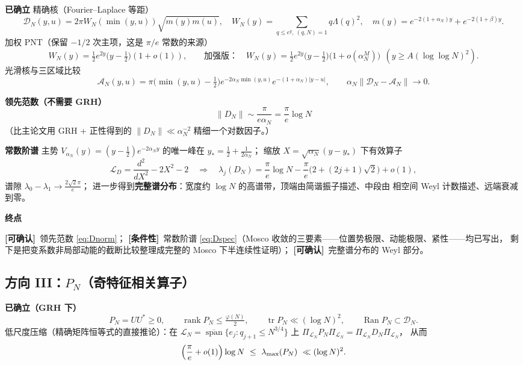 \documentclass[11pt,a4paper]{ctexart}
\newcommand{\Dk}{\mathcal{D}}
\newcommand{\Ak}{\mathcal{A}}
\newcommand{\al}{\alpha_{N}}
\newcommand{\be}{\beta}
\newcommand{\OK}{\textcolor{green!45!black}{\textbf{[可确认]}}}
\newcommand{\COND}{\textcolor{orange!85!black}{\textbf{[条件性]}}}
\begin{document}
\textbf{已确立}
精确核（Fourier--Laplace 等距）
\begin{equation}\label{eq:Dkernel}
\Dk_N(y,u)=2\pi W_N(\min(y,u))\sqrt{m(y)m(u)},\quad
W_N(y)=\sum_{q\le e^y,\ (q,N)=1}q\Lambda(q)^2,\quad
m(y)=e^{-2(1+\al)y}+e^{-2(1+\be)y}.
\end{equation}
加权 PNT（保留 $-1/2$ 次主项，这是 $\pi/e$ 常数的来源）
\begin{equation}\label{eq:PNT}
W_N(y)=\tfrac12e^{2y}\bigl(y-\tfrac12\bigr)(1+o(1)),
\qquad\text{加强版：}\quad
W_N(y)=\tfrac12e^{2y}\bigl(y-\tfrac12\bigr)\bigl(1+o(\al^M)\bigr)\ \ (y\ge A(\log\log N)^2).
\end{equation}
光滑核与三区域比较
\begin{equation}\label{eq:Asmooth}
\Ak_N(y,u)=\pi\bigl(\min(y,u)-\tfrac12\bigr)e^{-2\al\min(y,u)}e^{-(1+\al)|y-u|},
\qquad \al\|\Dk_N-\Ak_N\|\longrightarrow0 .
\end{equation}

\textbf{领先范数（不需要 GRH）}
\begin{equation}\label{eq:Dnorm}
\boxed{\ \|D_N\|\sim\frac{\pi}{e\al}=\frac{\pi}{e}\log N\ }
\end{equation}
（比主论文用 GRH + 正性得到的 $\|D_N\|\ll\al^{-2}$ 精细一个对数因子。）

\textbf{常数阶谱}
主势 $V_{\al}(y)=(y-\frac12)e^{-2\al y}$ 的唯一峰在 $y_*=\frac12+\frac{1}{2\al}$；
缩放 $X=\sqrt{\al}(y-y_*)$ 下有效算子
\begin{equation}
\mathcal L_D=\frac{d^2}{dX^2}-2X^2-2
\quad\Longrightarrow\quad
\lambda_j(D_N)=\frac{\pi}{e}\log N-\frac{\pi}{e}\bigl(2+(2j+1)\sqrt2\bigr)+o(1),\label{eq:Dspec}
\end{equation}
谱隙 $\lambda_0-\lambda_1\to\frac{2\sqrt2\pi}{e}$；
进一步得到\textbf{完整谱分布}：宽度约 $\log N$ 的高谱带，顶端由简谐振子描述、中段由
相空间 Weyl 计数描述、远端衰减到零。

\textbf{终点}

\OK\ 领先范数 \eqref{eq:Dnorm}；
\COND\ 常数阶谱 \eqref{eq:Dspec}（Mosco 收敛的三要素——位置势极限、动能极限、紧性——均已写出，
剩下是把变系数非局部动能的截断比较整理成完整的 Mosco 下半连续性证明）；
\OK\ 完整谱分布的 Weyl 部分。

\subsection{方向 III：$P_N$（奇特征相关算子）}

\textbf{已确立（GRH 下）}
\begin{equation}\label{eq:Pnd}
P_N=UU^*\ge0,\qquad \operatorname{rank}P_N\le\tfrac{\varphi(N)}{2},\qquad
\operatorname{tr}P_N\ll(\log N)^2,\qquad
\operatorname{Ran}P_N\subset\mathcal D_N .
\end{equation}
低尺度压缩（精确矩阵恒等式的直接推论）：在
$\mathcal L_N=\overline{\operatorname{span}}\{e_j:q_{j+1}\le N^{3/4}\}$ 上
$\Pi_{\mathcal L_N}P_N\Pi_{\mathcal L_N}=\Pi_{\mathcal L_N}D_N\Pi_{\mathcal L_N}$，
从而
\begin{equation}\label{eq:Pnlow}
\Bigl(\frac{\pi}{e}+o(1)\Bigr)\log N\ \le\ \lambda_{\max}(P_N)\ \ll(\log N)^2 .
\end{equation}
\end{document}
